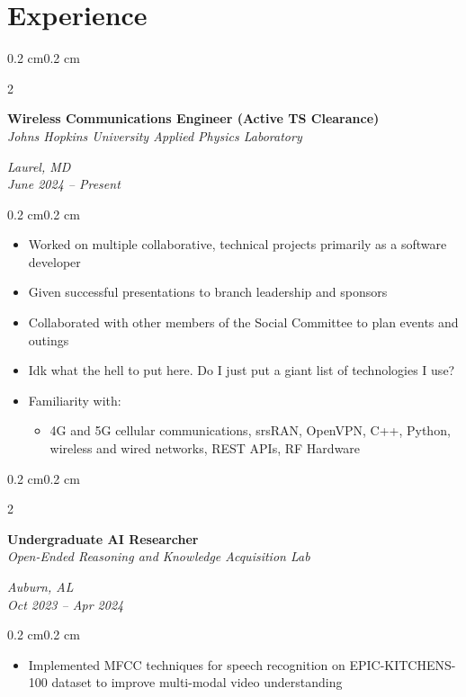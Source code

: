 \documentclass[10pt, letterpaper]{article}
\newenvironment{highlights}{
    \begin{itemize}[topsep=0.10 cm,parsep=0.10 cm,partopsep=0pt,itemsep=0pt,leftmargin=0.4 cm + 10pt]
}{
    \end{itemize}
}
\newenvironment{onecolentry}{
    \begin{adjustwidth}{0.2 cm}{0.2 cm}
}{
    \end{adjustwidth}
}
\newenvironment{twocolentry}[2][]{
    \onecolentry
    \def\secondColumn{#2}
    \setcolumnwidth{\fill, 4.5 cm}
    \begin{paracol}{2}
}{
    \switchcolumn \raggedleft \secondColumn
    \end{paracol}
    \endonecolentry
}
\begin{document}
    \section{Experience}
        \begin{twocolentry}{\textit{Laurel, MD} \\ \textit{June 2024 – Present}}
            \textbf{Wireless Communications Engineer (Active TS Clearance)} \\
            \textit{Johns Hopkins University Applied Physics Laboratory}
        \end{twocolentry}
        \vspace{0.10 cm}
        \begin{onecolentry}
            \begin{highlights}
                \item Worked on multiple collaborative, technical projects primarily as a software developer
                \item Given successful presentations to branch leadership and sponsors
                \item Collaborated with other members of the Social Committee to plan events and outings
                \item Idk what the hell to put here. Do I just put a giant list of technologies I use?
                \item Familiarity with:
                    \begin{highlights}
                        \item 4G and 5G cellular communications, srsRAN, OpenVPN, C++, Python, wireless and wired networks, REST APIs, RF Hardware
                    \end{highlights}
            \end{highlights}
        \end{onecolentry}

        \vspace{0.2 cm}

        \begin{twocolentry}{\textit{Auburn, AL} \\ \textit{Oct 2023 – Apr 2024}}
            \textbf{Undergraduate AI Researcher} \\
            \textit{Open-Ended Reasoning and Knowledge Acquisition Lab}
        \end{twocolentry}
        \vspace{0.10 cm}
        \begin{onecolentry}
            \begin{highlights}
                \item Implemented MFCC techniques for speech recognition on EPIC-KITCHENS-100 dataset to improve multi-modal video understanding
            \end{highlights}
        \end{onecolentry}
\end{document}
